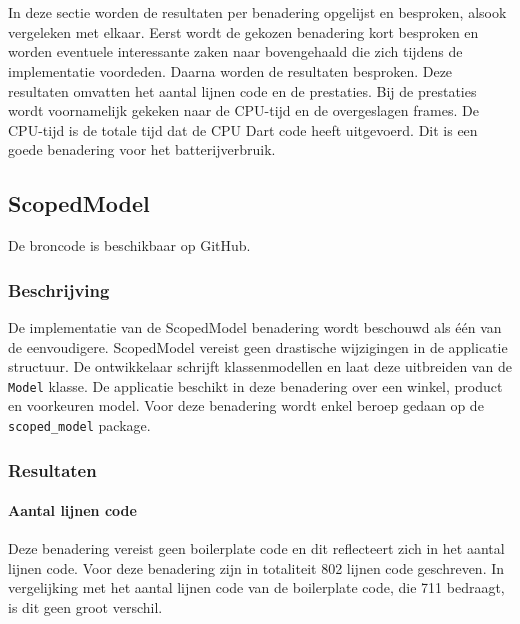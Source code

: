 

\chapter{}
\label{ch:experiment}

In deze sectie worden de resultaten per benadering opgelijst en besproken, alsook vergeleken met elkaar. Eerst wordt de gekozen benadering kort besproken en worden eventuele interessante zaken naar bovengehaald die zich tijdens de implementatie voordeden. Daarna worden de resultaten besproken. Deze resultaten omvatten het aantal lijnen code en de prestaties. \newline \newline Bij de prestaties wordt voornamelijk gekeken naar de CPU-tijd en de overgeslagen frames. De CPU-tijd is de totale tijd dat de CPU Dart code heeft uitgevoerd. Dit is een goede benadering voor het batterijverbruik.


\section{ScopedModel}
De broncode is beschikbaar op GitHub. \autocite{DeVrient2019a}
\subsection{Beschrijving}
De implementatie van de ScopedModel benadering wordt beschouwd als één van de eenvoudigere. ScopedModel vereist geen drastische wijzigingen in de applicatie structuur. De ontwikkelaar schrijft klassenmodellen en laat deze uitbreiden van de \verb|Model| klasse. De applicatie beschikt in deze benadering over een winkel, product en voorkeuren model. \newline \newline
Voor deze benadering wordt enkel beroep gedaan op de \verb|scoped_model| package. 


\subsection{Resultaten}
\subsubsection{Aantal lijnen code}
Deze benadering vereist geen boilerplate code en dit reflecteert zich in het aantal lijnen code. Voor deze benadering zijn in totaliteit 802 lijnen code geschreven. In vergelijking met het aantal lijnen code van de boilerplate code, die 711 bedraagt, is dit geen groot verschil. 

